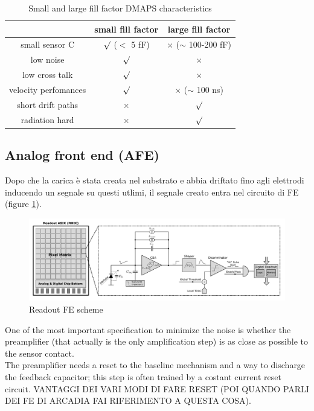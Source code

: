 \begin{titlepage}
\begin{table}
\begin{center}
\begin{tabular}{|c | c |c |}
\hline
& small fill factor & large fill factor\\
\hline
\hline
small sensor C & $\surd$ ($<$ 5 fF) & $\times$ ($\sim$ 100-200 fF)\\
low noise & $\surd$ & $\times$\\
low cross talk & $\surd$ & $\times$ \\
velocity perfomances & $\surd$ & $\times$ ($\sim$ 100 ns)\\
short drift paths & $\times$ & $\surd$ \\
radiation hard & $\times$ & $\surd$ \\
\hline
\end{tabular}
\caption{Small and large fill factor DMAPS characteristics}
\label{tab:DMAPS_large_small_fillfactor}
\end{center}
\end{table}

\subsection{Analog front end (AFE)}
Dopo che la carica è stata creata nel substrato e abbia driftato fino agli elettrodi
inducendo un segnale su questi utlimi, il segnale creato entra nel circuito di FE
(figure \ref{fig:readout_scheme}).

\begin{figure}
\centering\includegraphics[width=15cm]{figures/readout_scheme.png}
\caption{Readout FE scheme}
\label{fig:readout_scheme}
\end{figure}

One of the most important specification to minimize the noise is whether the preamplifier
(that actually is the only amplification step) is as close as possible to the sensor contact.\\
The preamplifier needs a reset to the baseline mechanism and a way to discharge
the feedback capacitor; this step is often trained by a costant current reset circuit.
VANTAGGI DEI VARI MODI DI FARE RESET (POI QUANDO PARLI DEI FE DI ARCADIA FAI RIFERIMENTO A QUESTA COSA).


\end{titlepage}
